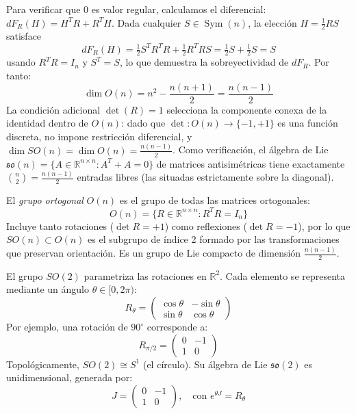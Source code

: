 Para verificar que $0$ es valor regular, calculamos el diferencial: $dF_R(H) = H^T R + R^T H$. Dada cualquier $S \in \operatorname{Sym}(n)$, la elección $H = \frac{1}{2}RS$ satisface
\[
	dF_R(H) = \tfrac{1}{2}S^T R^T R + \tfrac{1}{2}R^T R S = \tfrac{1}{2}S + \tfrac{1}{2}S = S
\]
usando $R^T R = I_n$ y $S^T = S$, lo que demuestra la sobreyectividad de $dF_R$. Por tanto:
\[
	\dim O(n) = n^2 - \frac{n(n+1)}{2} = \frac{n(n-1)}{2}
\]
La condición adicional $\det(R) = 1$ selecciona la componente conexa de la identidad dentro de $O(n)$: dado que $\det: O(n) \to \{-1, +1\}$ es una función discreta, no impone restricción diferencial, y $\dim SO(n) = \dim O(n) = \frac{n(n-1)}{2}$. Como verificación, el álgebra de Lie $\mathfrak{so}(n) = \{A \in \mathbb{R}^{n \times n} : A^T + A = 0\}$ de matrices antisimétricas tiene exactamente $\binom{n}{2} = \frac{n(n-1)}{2}$ entradas libres (las situadas estrictamente sobre la diagonal).

\begin{definition}\label{def:grupo_o_n}
El \textit{grupo ortogonal} $O(n)$ es el grupo de todas las matrices ortogonales:
\begin{equation}
O(n) = \{R \in \mathbb{R}^{n \times n} : R^T R = I_n\}
\end{equation}
Incluye tanto rotaciones ($\det R = +1$) como reflexiones ($\det R = -1$), por lo que $SO(n) \subset O(n)$ es el subgrupo de índice 2 formado por las transformaciones que preservan orientación. Es un grupo de Lie compacto de dimensión $\frac{n(n-1)}{2}$.
\end{definition}

\begin{example}\label{ex:so2_rotaciones}
El grupo $SO(2)$ parametriza las rotaciones en $\mathbb{R}^2$. Cada elemento se representa mediante un ángulo $\theta \in [0, 2\pi)$:
\begin{equation}
R_\theta = \begin{pmatrix}
\cos\theta & -\sin\theta \\
\sin\theta & \cos\theta
\end{pmatrix}
\end{equation}
Por ejemplo, una rotación de $90^\circ$ corresponde a:
\begin{equation}
R_{\pi/2} = \begin{pmatrix}
0 & -1 \\
1 & 0
\end{pmatrix}
\end{equation}
Topológicamente, $SO(2) \cong S^1$ (el círculo). Su álgebra de Lie $\mathfrak{so}(2)$ es unidimensional, generada por:
\begin{equation}
J = \begin{pmatrix}
0 & -1 \\
1 & 0
\end{pmatrix}, \quad \text{con } e^{\theta J} = R_\theta
\end{equation}
\end{example}

